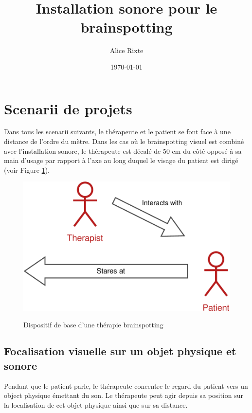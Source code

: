\documentclass[french]{article}
\begin{document}
\title{Installation sonore pour le brainspotting}
\author{Alice Rixte}
\date{\today}
\maketitle





\section{Scenarii de projets}
\label{scenarii}

Dans tous les scenarii suivants, le thérapeute et le patient se font face à une distance de l'ordre du mètre. Dans les cas où le brainspotting visuel est combiné avec l'installation sonore, le thérapeute est décalé de 50 cm du côté opposé à sa main d'usage  par rapport à l'axe au long duquel le visage du patient est dirigé (voir Figure \ref{basic-situation}).
\begin{figure}[!h]
	\centering
	\includegraphics[scale = 0.6]{schemas/basic-situation.pdf}
	\label{basic-situation}
	\caption{Dispositif de base d'une thérapie brainspotting}
\end{figure}
\subsection{Focalisation visuelle sur un objet physique et sonore}
Pendant que le patient parle, le thérapeute concentre le regard du patient vers un object physique émettant du son. Le thérapeute peut agir depuis sa position sur la localisation de cet objet physique ainsi que sur sa distance.
\end{document}
